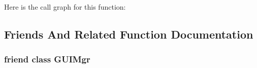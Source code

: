 Here is the call graph for this function\+:




\subsection{Friends And Related Function Documentation}
\hypertarget{class_agmd_1_1_a_widget_a40dc1ec9aca40005b372d5a92ca6fd06}{
\subsubsection[{G\+U\+I\+Mgr}]{\setlength{\rightskip}{0pt plus 5cm}friend class {\bf G\+U\+I\+Mgr}\hspace{0.3cm}{\ttfamily [friend]}}}\label{class_agmd_1_1_a_widget_a40dc1ec9aca40005b372d5a92ca6fd06}


